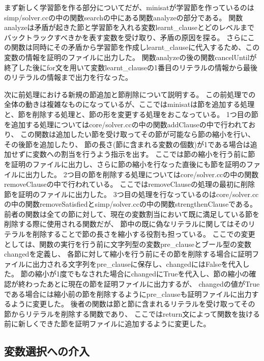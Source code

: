 \documentclass[titlepage]{jsarticle}
\begin{document}
まず新しく学習節を作る部分についてだが、minisatが学習節を作っているのはsimp/solver.ccの中の関数searchの中にある関数analyzeの部分である。
関数analyzeは矛盾が起きた節と学習節を入れる変数learnt\_clauseとどのレベルまでバックトラックすべきかを表す変数を受け取り、矛盾の原因を探る。
さらにこの関数は同時にその矛盾から学習節を作成しlearnt\_clauseに代入するため、この変数の情報を証明のファイルに出力した。
関数analyzeの後の関数cancelUntilが終了した後にfor文を用いて変数learnt\_clauseの1番目のリテラルの情報から最後のリテラルの情報まで出力を行なった。

次に前処理における新規の節追加と節削除について説明する。
この前処理での全体の動きは複雑なものになっているが、ここではminisatは節を追加する処理と、節を削除する処理と、節の形を変更する処理をおこなっている。
1つ目の節を追加する処理についてはcore/solver.ccの中の関数addClauseの中で行われており、
この関数は追加したい節を受け取ってその節が可能なら節の縮小を行い、その後節を追加したり、
節の長さ(節に含まれる変数の個数)が1である場合は追加せずに変数への割当を行うよう指示を出す。
ここでは節の縮小を行う前に節を証明のファイルに出力し、さらに節の縮小を行なった直後にも節を証明のファイルに出力した。
2つ目の節を削除する処理についてはcore/solver.ccの中の関数removeClauseの中で行われている。
ここではremoveClauseの処理の最初に削除節を証明のファイルに出力した。
3つ目の処理を行なっているのはcore/solver.ccの中の関数removeSatisfiedとsimp/solver.ccの中の関数strengthenClauseである。
前者の関数は全ての節に対して、現在の変数割当において既に満足している節を削除する際に使用される関数だが、
節中の既に偽なリテラルに関してはそのリテラルを削除することで節の長さを縮小する役割も担っている。
ここでの変更としては、関数の実行を行う前に文字列型の変数pre\_clauseとブール型の変数changedを定義し、
各節に対して縮小を行う前にその節を削除する場合に証明ファイルに出力される文字列をpre\_clauseに保存し、changedにはFalseを代入した。
節の縮小が1度でもなされた場合にchangedにTrueを代入し、節の縮小の確認が終わったあとに現在の節を証明ファイルに出力するが、
changedの値がTrueである場合には縮小前の節を削除するようにpre\_clauseも証明ファイルに出力するように変更した。
後者の関数は節と節に含まれるリテラルを受け取ってその節からリテラルを削除する関数であり、
ここではreturn文によって関数を抜ける前に新しくできた節を証明ファイルに追加するように変更した。





\subsection{変数選択への介入}
\end{document}
